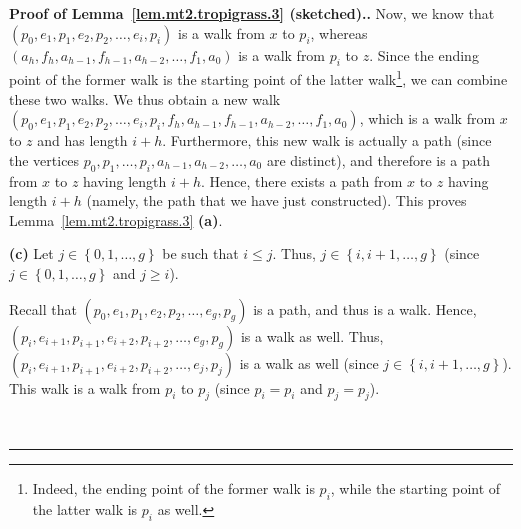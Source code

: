 \documentclass[numbers=enddot,12pt,final,onecolumn,notitlepage]{scrartcl}%
\theoremstyle{definition}
\newenvironment{proof}[1][Proof]{\noindent\textbf{#1.} }{\ \rule{0.5em}{0.5em}}
\newcommand{\set}[1]{\left\{ #1 \right\}}
\newcommand{\tup}[1]{\left( #1 \right)}
\begin{document}
\begin{proof}[Proof of Lemma~\ref{lem.mt2.tropigrass.3} (sketched).]
Now, we know that
$\tup{p_0, e_1, p_1, e_2, p_2, \ldots, e_i, p_i}$ is a walk
from $x$ to $p_i$, whereas
$\tup{a_h, f_h, a_{h-1}, f_{h-1}, a_{h-2}, \ldots, f_1, a_0}$
is a walk from $p_i$ to $z$.
Since the ending point of the former walk is the starting
point of the latter walk\footnote{Indeed, the ending point of the
    former walk is $p_i$, while the starting point of the latter
    walk is $p_i$ as well.},
we can combine these two walks.
We thus obtain a new walk
$\tup{p_0, e_1, p_1, e_2, p_2, \ldots, e_i, p_i, f_h,
      a_{h-1}, f_{h-1}, a_{h-2}, \ldots, f_1, a_0}$,
which is a walk from $x$ to $z$ and has length
$i + h$.
Furthermore, this new walk is actually a path
(since the vertices
$p_0, p_1, \ldots, p_i, a_{h-1}, a_{h-2}, \ldots, a_0$
are distinct),
and therefore is a path from $x$ to $z$ having length
$i + h$.
Hence, there exists a path from $x$ to $z$ having
length $i + h$ (namely, the path that we have just
constructed).
This proves Lemma~\ref{lem.mt2.tropigrass.3} \textbf{(a)}.

\textbf{(c)} Let $j \in \set{0, 1, \ldots, g}$ be such that
$i \leq j$.
Thus, $j \in \set{i, i+1, \ldots, g}$ (since
$j \in \set{0, 1, \ldots, g}$ and $j \geq i$).

Recall that
$\tup{p_0, e_1, p_1, e_2, p_2, \ldots, e_g, p_g}$ is a path,
and thus is a walk.
Hence,
$\tup{p_i, e_{i+1}, p_{i+1}, e_{i+2}, p_{i+2}, \ldots, e_g, p_g}$
is a walk as well.
Thus,
$\tup{p_i, e_{i+1}, p_{i+1}, e_{i+2}, p_{i+2}, \ldots, e_j, p_j}$
is a walk as well (since $j \in \set{i, i+1, \ldots, g}$).
This walk is a walk from $p_i$ to $p_j$ (since $p_i = p_i$ and
$p_j = p_j$).


\end{proof}
\end{document}
